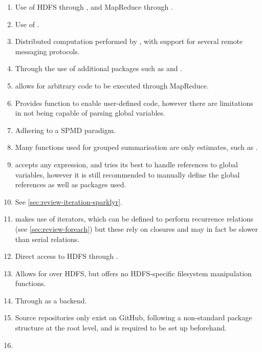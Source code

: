 \begin{enumerate} \item\label{itm:x1} Use of HDFS through \cite{revo2013rhdfs}, and MapReduce through \cite{revo2014plyrmr}.
	\item\label{itm:x2}
	Use of \cite{luraschi20}.
	\item\label{itm:x3}
	Distributed computation performed by , with support for several remote messaging protocols\cites{Chen2012pbdMPIpackage,Schmidt2015pbdCSpackage}.
	\item\label{itm:x4}
	Through the use of additional packages such as  and \cites{weston17,luraschi20}.
	\item\label{itm:x5} \cite{revo2015rmr2} allows for arbitrary \R{} code to be executed through MapReduce.
	\item\label{itm:x6}
	Provides  function to enable user-defined code, however there are limitations in not being capable of parsing global variables.
	\item\label{itm:x7}
	Adhering to a SPMD paradigm.
	\item\label{itm:x8}
	Many functions used for grouped summarisation are only estimates, such as \cite{zj19:_group_by}.
	\item\label{itm:x9}  accepts any expression, and tries its best to handle references to global variables, however it is still recommended to manually define the global references as well as packages used.
	\item\label{itm:x10}
	See \cref{sec:review-iteration-sparklyr}.
	\item\label{itm:x11}  makes use of iterators, which can be defined to perform recurrence relations (see \cref{sec:review-foreach}) but these rely on closures and may in fact be slower than serial relations.
	\item\label{itm:x12}
	Direct access to HDFS through \cite{revo2013rhdfs}.
	\item\label{itm:x13}
	Allows for  over HDFS, but offers no HDFS-specific filesystem manipulation functions.
	\item\label{itm:x14}
	Through  as a backend.
	\item\label{itm:x15}
	Source repositories only exist on GitHub, following a non-standard package structure at the root level, and  is required to be set up beforehand.
	\item\label{itm:x16}

\end{enumerate}
